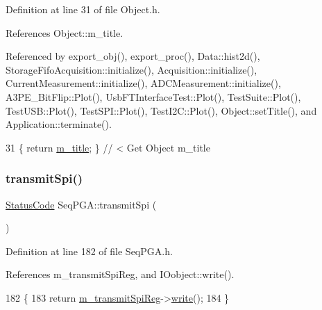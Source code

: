 Definition at line 31 of file Object.\+h.



References Object\+::m\+\_\+title.



Referenced by export\+\_\+obj(), export\+\_\+proc(), Data\+::hist2d(), Storage\+Fifo\+Acquisition\+::initialize(), Acquisition\+::initialize(), Current\+Measurement\+::initialize(), A\+D\+C\+Measurement\+::initialize(), A3\+P\+E\+\_\+\+Bit\+Flip\+::\+Plot(), Usb\+F\+T\+Interface\+Test\+::\+Plot(), Test\+Suite\+::\+Plot(), Test\+U\+S\+B\+::\+Plot(), Test\+S\+P\+I\+::\+Plot(), Test\+I2\+C\+::\+Plot(), Object\+::set\+Title(), and Application\+::terminate().


\begin{DoxyCode}
31 \{ \textcolor{keywordflow}{return} \hyperlink{classObject_affbeea1953eb5163573b92fad8f75727}{m\_title};      \} \textcolor{comment}{// < Get Object m\_title}
\end{DoxyCode}
\mbox{\label{classSeqPGA_a579b4ab222e1c4778640948fbf2a8805}} 
\subsubsection{\texorpdfstring{transmit\+Spi()}{transmitSpi()}}
{\footnotesize\ttfamily \hyperlink{classStatusCode}{Status\+Code} Seq\+P\+G\+A\+::transmit\+Spi (\begin{DoxyParamCaption}{ }\end{DoxyParamCaption})\hspace{0.3cm}{\ttfamily [inline]}}



Definition at line 182 of file Seq\+P\+G\+A.\+h.



References m\+\_\+transmit\+Spi\+Reg, and I\+Oobject\+::write().


\begin{DoxyCode}
182                            \{
183     \textcolor{keywordflow}{return} \hyperlink{classSeqPGA_a4e0ffb37b1cd947d389354ac25723ab8}{m\_transmitSpiReg}->\hyperlink{classIOobject_a9f6984bc9f0fadcf800f1be2523ac744}{write}();
184   \}
\end{DoxyCode}
\mbox{\label{classHierarchy_a76e914b9a677a22a82deb74d892bf261}} 
